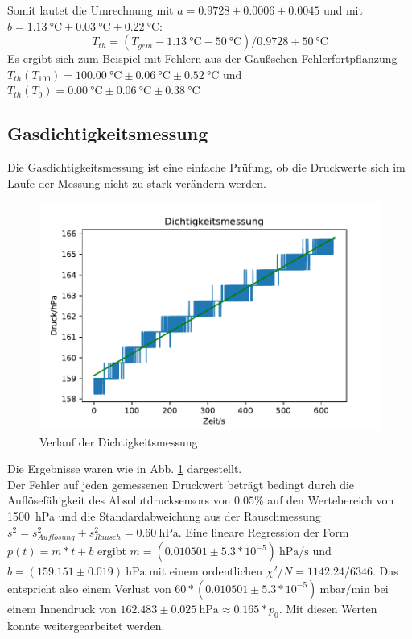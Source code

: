 \documentclass[]{article}
\begin{document}
Somit lautet die Umrechnung
mit $a = 0.9728 \pm 0.0006 \pm 0.0045$
und mit $b = \SI{1.13}{\celsius} \pm \SI{0.03}{\celsius} \pm \SI{0.22}{\celsius}$:
\begin{equation}
T_{th} = (T_{gem}-\SI{1.13}{\celsius}-\SI{50}{\celsius})/0.9728 + \SI{50}{\celsius}
\label{Kalibrierung}
\end{equation}
Es ergibt sich zum Beispiel mit Fehlern aus der Gaußschen Fehlerfortpflanzung $T_{th}(T_{100}) = \SI{100.00}{\celsius} \pm  \SI{0.06}{\celsius} \pm \SI{0.52}{\celsius}$
und $T_{th}(T_0) = \SI{0.00}{\celsius} \pm \SI{0.06}{\celsius} \pm \SI{0.38}{\celsius}$
\\
\subsection{Gasdichtigkeitsmessung}
Die Gasdichtigkeitsmessung ist eine einfache Prüfung, ob die Druckwerte sich im Laufe der Messung nicht zu stark verändern werden.
\begin{figure}
	\begin{center}
		\includegraphics[scale=0.9]{Images/Kalib_Dichtigkeitsmessung.pdf}
		\caption{Verlauf der Dichtigkeitsmessung}
		\label{GD_data}
	\end{center}
\end{figure}
Die Ergebnisse waren wie in Abb. \ref{GD_data} dargestellt. \\
Der Fehler auf jeden gemessenen Druckwert beträgt bedingt durch die Auflösefähigkeit des Absolutdrucksensors von $0.05\%$ auf den Wertebereich von \SI{1500}{\hecto \pascal} und die
 Standardabweichung aus der Rauschmessung $s^{2} = s^{2}_{Aufl\ddot{o}sung}+s^{2}_{Rausch} = \SI{0.60}{\hecto \pascal}$. 
Eine lineare Regression der Form $p(t)=m*t+b$ ergibt $m = (0.010501 \pm 5.3*10^{-5})\SI{}{\hecto \pascal/ \second}$ und $b = (159.151 \pm 0.019)\SI{}{\hecto \pascal}$ mit einem ordentlichen $\chi ^{2}/N=1142.24 / 6346$. Das entspricht also einem Verlust von $60*(0.010501 \pm 5.3*10^{-5})\SI{}{\milli \bar / \minute}$ bei einem Innendruck von $162.483 \pm 0.025 \SI{}{\hecto \pascal} \approx 0.165*p_0$. Mit diesen Werten konnte weitergearbeitet werden.
\end{document}

